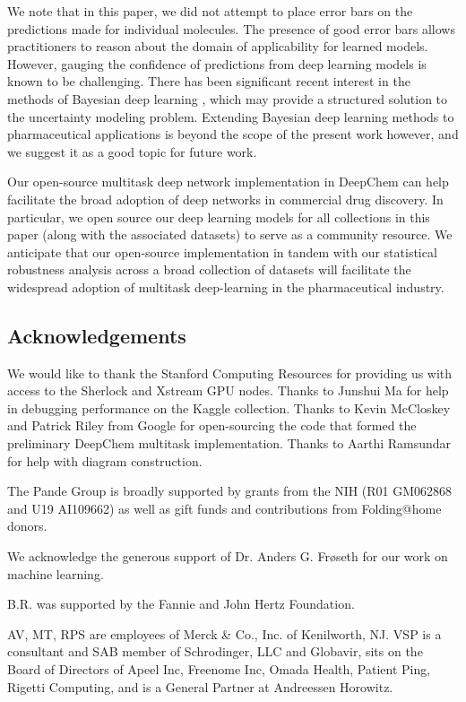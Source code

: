 

We note that in this paper, we did not attempt to place error bars on the predictions made for individual molecules. The presence of good error bars allows practitioners to reason about the domain of applicability for learned models. However, gauging the confidence of predictions from deep learning models is known to be challenging. There has been significant recent interest in the methods of Bayesian deep learning \cite{kendall2017uncertainties}, which may provide a structured solution to the uncertainty modeling problem. Extending Bayesian deep learning methods to pharmaceutical applications is beyond the scope of the present work however, and we suggest it as a good topic for future work.


Our open-source multitask deep network implementation in DeepChem can help facilitate the broad adoption of deep networks in commercial drug discovery. In particular, we open source our deep learning models for all collections in this paper (along with the associated datasets) to serve as a community resource. We anticipate that our open-source implementation in tandem with our statistical robustness analysis across a broad collection of datasets will facilitate the widespread adoption of multitask deep-learning in the pharmaceutical industry.


\subsection{Acknowledgements}

We would like to thank the Stanford Computing Resources for providing us with access to the Sherlock and Xstream GPU nodes. Thanks to Junshui Ma for help in debugging performance on the Kaggle collection. Thanks to Kevin McCloskey and Patrick Riley from Google for open-sourcing the code that formed the preliminary DeepChem multitask implementation. Thanks to Aarthi Ramsundar for help with diagram construction.

The Pande Group is broadly supported by grants from the NIH (R01 GM062868 and U19 AI109662) as well as gift funds and contributions from Folding@home donors.

We acknowledge the generous support of Dr. Anders G. Fr{\o}seth for our work on machine learning.

B.R. was supported by the Fannie and John Hertz Foundation.

AV, MT, RPS are employees of Merck \& Co., Inc. of Kenilworth, NJ. VSP is a consultant and SAB member of Schrodinger, LLC and Globavir, sits on the Board of Directors of Apeel Inc, Freenome Inc, Omada Health, Patient Ping, Rigetti Computing, and is a General Partner at Andreessen Horowitz.

